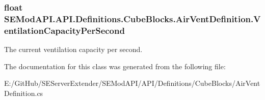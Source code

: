 \subsubsection[{Ventilation\+Capacity\+Per\+Second}]{\setlength{\rightskip}{0pt plus 5cm}float S\+E\+Mod\+A\+P\+I.\+A\+P\+I.\+Definitions.\+Cube\+Blocks.\+Air\+Vent\+Definition.\+Ventilation\+Capacity\+Per\+Second\hspace{0.3cm}{\ttfamily [get]}}\label{class_s_e_mod_a_p_i_1_1_a_p_i_1_1_definitions_1_1_cube_blocks_1_1_air_vent_definition_a588e207b1fa8f45d7e634bdc4e8a3cfb}


The current ventilation capacity per second. 



The documentation for this class was generated from the following file\+:\begin{DoxyCompactItemize}
\item 
E\+:/\+Git\+Hub/\+S\+E\+Server\+Extender/\+S\+E\+Mod\+A\+P\+I/\+A\+P\+I/\+Definitions/\+Cube\+Blocks/Air\+Vent\+Definition.\+cs\end{DoxyCompactItemize}
